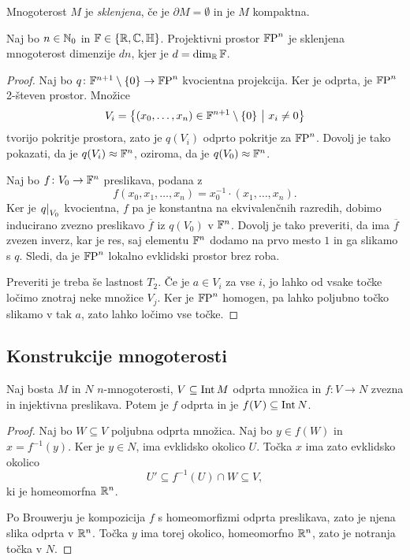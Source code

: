 \begin{definicija}
Mnogoterost $M$ je \emph{sklenjena},
če je $\partial M = \emptyset$ in je $M$ kompaktna.
\end{definicija}

\begin{trditev}
Naj bo $n \in \mathbb{N}_0$ in $\mathbb{F} \in \left\{\mathbb{R}, \mathbb{C}, \mathbb{H}\right\}$. Projektivni
prostor $\mathbb{F}\!\operatorname{P}^{n}$ je sklenjena mnogoterost dimenzije $dn$,
kjer je $d = \dim_{\mathbb{R}} \mathbb{F}$.
\end{trditev}

\begin{proof}
Naj bo $q \colon \mathbb{F}^{n+1} \setminus \left\{0\right\} \to \mathbb{F}\!\operatorname{P}^{n}$
kvocientna projekcija. Ker je odprta, je $\mathbb{F}\!\operatorname{P}^{n}$ 2-števen
prostor. Množice
\[
V_i =
\left\{(x_0, \dots, x_n) \in \mathbb{F}^{n+1} \setminus \left\{0\right\}~\middle\vert~x_i \ne 0\right\}
\]
tvorijo pokritje prostora, zato je $q(V_i)$ odprto pokritje za
$\mathbb{F}\!\operatorname{P}^{n}$. Dovolj je tako pokazati, da je
$q(V_i) \approx \mathbb{F}^n$, oziroma, da je $q(V_0) \approx \mathbb{F}^n$.

Naj bo $f \colon V_0 \to \mathbb{F}^n$ preslikava, podana z
\[
f(x_0, x_1, \dots, x_n) = x_0^{-1} \cdot (x_1, \dots, x_n).
\]
Ker je $\left. q\right|_{V_0}^{}$ kvocientna, $f$ pa je konstantna na
ekvivalenčnih razredih, dobimo inducirano zvezno preslikavo
$\overline{f}$ iz $q(V_0)$ v $\mathbb{F}^n$. Dovolj je tako preveriti, da
ima $\overline{f}$ zvezen inverz, kar je res, saj elementu $\mathbb{F}^n$
dodamo na prvo mesto $1$ in ga slikamo s $q$. Sledi, da je
$\mathbb{F}\!\operatorname{P}^{n}$ lokalno evklidski prostor brez roba.

Preveriti je treba še lastnost $T_2$. Če je $a \in V_i$ za vse $i$,
jo lahko od vsake točke ločimo znotraj neke množice $V_j$. Ker je
$\mathbb{F}\!\operatorname{P}^{n}$ homogen, pa lahko poljubno točko slikamo v tak $a$,
zato lahko ločimo vse točke.
\end{proof}

\newpage

\subsection{Konstrukcije mnogoterosti}

\begin{izrek}
Naj bosta $M$ in $N$ $n$-mnogoterosti, $V \subseteq \operatorname{Int} M$ odprta
množica in $f \colon V \to N$ zvezna in injektivna preslikava.
Potem je $f$ odprta in je $f(V) \subseteq \operatorname{Int} N$.
\end{izrek}

\begin{proof}
Naj bo $W \subseteq V$ poljubna odprta množica. Naj bo $y \in f(W)$
in $x = f^{-1}(y)$. Ker je $y \in N$, ima evklidsko okolico $U$.
Točka $x$ ima zato evklidsko okolico
\[
U' \subseteq f^{-1}(U) \cap W \subseteq V,
\]
ki je homeomorfna $\mathbb{R}^n$.

Po Brouwerju je kompozicija $f$ s homeomorfizmi odprta preslikava,
zato je njena slika odprta v $\mathbb{R}^n$. Točka $y$ ima torej okolico,
homeomorfno $\mathbb{R}^n$, zato je notranja točka v $N$.
\end{proof}

